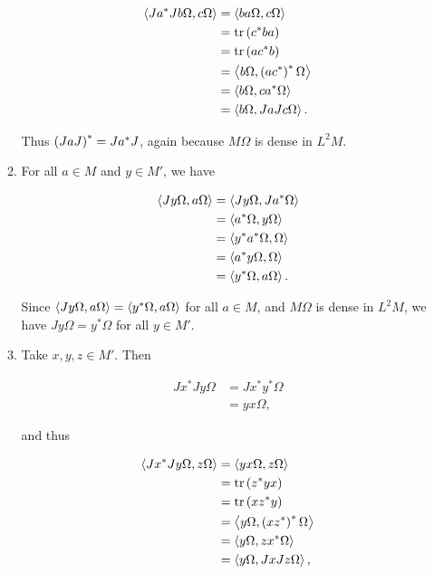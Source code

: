 \documentclass[a4paper,10pt]{report}
\begin{document}
\begin{enumerate}
\begin{enumerate}
                  \begin{align*}
                    \ET J a^* J b \Omega , c \Omega \TE%
                    &= \ET b a \Omega , c \Omega \TE\\
                    &= \tr \E c^* b a \R\\
                    &= \tr \E a c^* b \R\\
                    &= \ET b \Omega , \E a c^* \R^* \Omega \TE\\
                    &= \ET b \Omega , c a^* \Omega \TE\\
                    &= \ET b \Omega , J a J c \Omega \TE.
                  \end{align*}

                  Thus $\left( J a J \right)^* = J a^* J$, again because $M \Omega$ is dense in $L^2 M$.


		\item For all $a \in M$ and $y \in M'$, we have

                  \begin{align*}
                    \ET J y \Omega , a \Omega \TE%
                    &= \ET J y \Omega , J a^* \Omega \TE\\
                    &= \ET a^* \Omega , y \Omega \TE\\
                    &= \ET y^* a^* \Omega , \Omega \TE\\
                    &= \ET a^* y \Omega , \Omega \TE\\
                    &= \ET y^* \Omega , a \Omega \TE.
                  \end{align*}

                  Since $\left\langle J y \Omega , a \Omega \right\rangle = \left\langle y^* \Omega , a \Omega \right\rangle$ for all $a \in M$, and $M \Omega$ is dense in $L^2 M$, we have $J y \Omega = y^* \Omega$ for all $y \in M'$.

		\item Take $x , y , z \in M'$.  Then

                  \begin{align*}
                    J x^* J y \Omega%
                    &= J x^* y^* \Omega\\
                    &= y x \Omega,
                  \end{align*}

                  and thus

                  \begin{align*}
                    \ET J x^* J y \Omega , z \Omega \TE%
                    &= \ET y x \Omega , z \Omega \TE\\
                    &= \tr \E z^* y x \R\\
                    &= \tr \E x z^* y \R \\
                    &= \ET y \Omega , \E x z^* \R^* \Omega \TE\\
                    &= \ET y \Omega , z x^* \Omega \TE\\
                    &= \ET y \Omega , J x J z \Omega \TE,
                  \end{align*}


\end{enumerate}
\end{enumerate}
\end{document}
